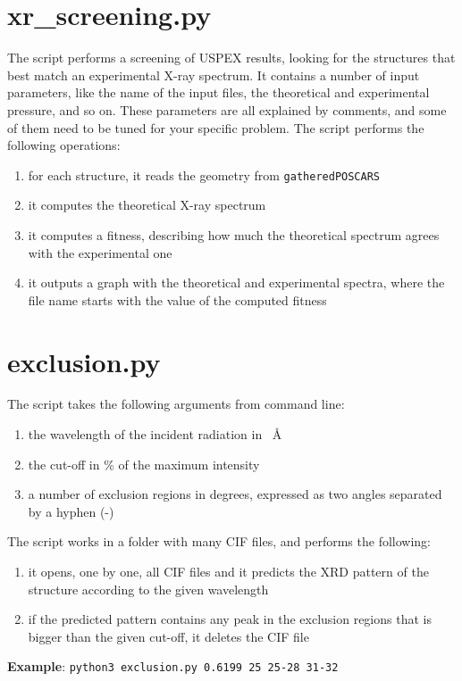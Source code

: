 \documentclass{article}
\begin{document}
\section{xr\_screening.py}
The script performs a screening of USPEX results, looking for the structures that best match an experimental X-ray spectrum. It contains a number of input parameters, like the name of the input files, the theoretical and experimental pressure, and so on. These parameters are all explained by comments, and some of them need to be tuned for your specific problem. The script performs the following operations:
\begin{enumerate}
	\item for each structure, it reads the geometry from \texttt{gatheredPOSCARS}
	\item it computes the theoretical X-ray spectrum
	\item it computes a fitness, describing how much the theoretical spectrum agrees with the experimental one
	\item it outputs a graph with the theoretical and experimental spectra, where the file name starts with the value of the computed fitness
\end{enumerate}

\section{exclusion.py}
The script takes the following arguments from command line:
\begin{enumerate}
	\item the wavelength of the incident radiation in \SI{}{\angstrom}
	\item the cut-off in \% of the maximum intensity
	\item a number of exclusion regions in degrees, expressed as two angles separated by a hyphen (-)
\end{enumerate}
The script works in a folder with many CIF files, and performs the following:
\begin{enumerate}
	\item it opens, one by one, all CIF files and it predicts the XRD pattern of the structure according to the given wavelength
	\item if the predicted pattern contains any peak in the exclusion regions that is bigger than the given cut-off, it deletes the CIF file
\end{enumerate}
\textbf{Example}: \texttt{python3 exclusion.py 0.6199 25 25-28 31-32}
\end{document}
